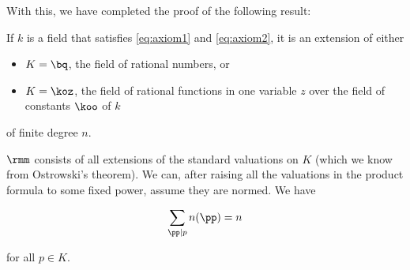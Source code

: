 With this, we have completed the proof of the following result:

\begin{thm}
  If $k$ is a field that satisfies \ref{eq:axiom1} and \ref{eq:axiom2}, it is an
  extension of either
  \begin{itemize}
  \item $K = \bq$, the field of rational numbers, or
  \item $K = \koz$, the field of rational functions in one variable $z$ over the
    field of constants $\koo$ of $k$
  \end{itemize}
  of finite degree $n$.

  $\rmm$ consists of all extensions of the standard valuations on $K$ (which we
  know from Ostrowski's theorem). We can, after raising all the valuations in the
  product formula to some fixed power, assume they are normed. We have

  \[ \sum_{\pp|p}n(\pp) = n \]

  for all $p\in K$.
\end{thm}
